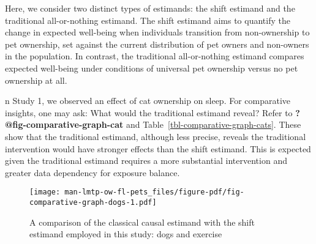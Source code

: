 \documentclass[
  singlecolumn,
  9pt]{article}
\begin{document}
\newpage{}

Here, we consider two distinct types of estimands: the shift estimand
and the traditional all-or-nothing estimand. The shift estimand aims to
quantify the change in expected well-being when individuals transition
from non-ownership to pet ownership, set against the current
distribution of pet owners and non-owners in the population. In
contrast, the traditional all-or-nothing estimand compares expected
well-being under conditions of universal pet ownership versus no pet
ownership at all.

n Study 1, we observed an effect of cat ownership on sleep. For
comparative insights, one may ask: What would the traditional estimand
reveal? Refer to \textbf{?@fig-comparative-graph-cat} and
Table~\ref{tbl-comparative-graph-cats}. These show that the traditional
estimand, although less precise, reveals the traditional intervention
would have stronger effects than the shift estimand. This is expected
given the traditional estimand requires a more substantial intervention
and greater data dependency for exposure balance.

\begin{figure}

{\centering \texttt{[image: man-lmtp-ow-fl-pets\_files/figure-pdf/fig-comparative-graph-dogs-1.pdf]}

}

\caption{\label{fig-comparative-graph-dogs}A comparison of the classical
causal estimand with the shift estimand employed in this study: dogs and
exercise}

\end{figure}
\end{document}
